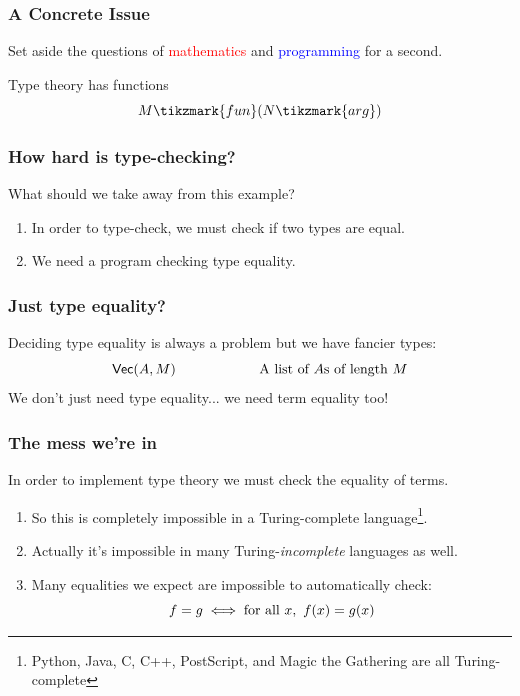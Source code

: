 \documentclass[usenames,dvipsnames,aspectratio=169,12pt]{beamer}
\begin{document}
\begin{frame}
  \frametitle{A Concrete Issue}
  Set aside the questions of \textcolor{Red}{mathematics} and \textcolor{Blue}{programming} for a
  second.
  \bigskip

  Type theory has functions
  \[
    \App{M\tikzmark{fun}}{N\tikzmark{arg}}
  \]
\end{frame}

\begin{frame}
  \frametitle{How hard is type-checking?}
  What should we take away from this example?
  \begin{enumerate}
  \item In order to type-check, we must check if two types are equal.
  \item We need a program checking type equality.
  \end{enumerate}
\end{frame}

\begin{frame}
  \frametitle{Just type equality?}
  Deciding type equality is always a problem but we have fancier types:
  \[
    \mathsf{Vec}(A, M) \qquad\quad\qquad\quad\text{A list of $A$s of length $M$}
  \]
  \pause
  We don't just need type equality... we need term equality too!
\end{frame}

\begin{frame}
  \frametitle{The mess we're in}
  In order to implement type theory we must check the equality of terms.
  \begin{enumerate}
  \item So this is completely impossible in a Turing-complete language\footnote{Python, Java, C,
      C++, PostScript, and Magic the Gathering are all Turing-complete}.
  \item Actually it's impossible in many Turing-\emph{incomplete} languages as well.
  \item Many equalities we expect are impossible to automatically check:
    \[
      f = g \iff \text{for all } x,\ f(x) = g(x)
    \]
  \end{enumerate}
\end{frame}
\end{document}
